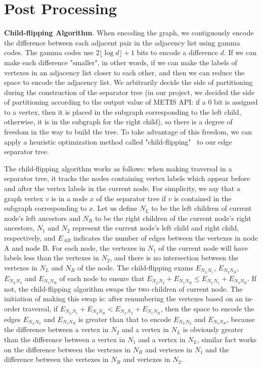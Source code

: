 \documentclass[12pt,glossary]{dalthesis}
\begin{document}
\bigskip
\bigskip

\section{Post Processing}

\textbf{Child-flipping Algorithm}. When encoding the graph, we contiguously encode the difference between each adjacent pair in the adjacency list using gamma codes. The gamma codes use $2\lfloor \log d \rfloor + 1$ bits to encode a difference $d$. If we can make each difference "smaller", in other words, if we can make the labels of vertexes in an adjacency list closer to each other, and then we can reduce the space to encode the adjacency list. We arbitrarily decide the side of partitioning during the construction of the separator tree (in our project, we decided the side of partitioning according to the output value of METIS API: if a 0 bit is assigned to a vertex, then it is placed in the subgraph corresponding to the left child, otherwise, it is in the subgraph for the right child), so there is a degree of freedom in the way to build the tree. To take advantage of this freedom, we can apply a heuristic optimization method called "child-flipping"~\cite{compact-representation} to our edge separator tree.

\bigskip
\bigskip

The child-flipping algorithm works as follows: when making traversal in a separator tree, it tracks the nodes containing vertex labels which appear before and after the vertex labels in the current node. For simplicity, we say that a graph vertex $v$ is in a node $x$ of the separator tree if $v$ is contained in the subgraph corresponding to $x$. Let us define $N_{L}$ to be the left children of current node's left ancestors and $N_{R}$ to be the right children of the current node's right ancestors, $N_{1}$ and $N_{2}$ represent the current node's left child and right child, respectively, and $E_{AB}$ indicates the number of edges between the vertexes in node A and node B. For each node, the vertexes in $N_{1}$ of the current node will have labels less than the vertexes in $N_{2}$, and there is no intersection between the vertexes in $N_{L}$ and $N_{R}$ of the node. The child-flipping exams $E_{N_{L}N_{1}}$, $E_{N_{2}N_{R}}$, $E_{N_{L}N_{2}}$ and $E_{N_{1}N_{R}}$ of each node to ensure that $E_{N_{L}N_{2}} + E_{N_{1}N_{R}} \leq E_{N_{L}N_{1}} + E_{N_{2}N_{R}}$. If not, the child-flipping algorithm swaps the two children of current node. The initiation of making this swap is: after renumbering the vertexes based on an in-order traversal, if $E_{N_{L}N_{1}} + E_{N_{2}N_{R}} < E_{N_{L}N_{2}} + E_{N_{1}N_{R}}$, then the space to encode the edges $E_{N_{L}N_{2}}$ and $E_{N_{1}N_{R}}$ is greater than that to encode $E_{N_{L}N_{2}}$ and $E_{N_{1}N_{R}}$, because the difference between a vertex in $N_{2}$ and a vertex in $N_{L}$ is obviously greater than the difference between a vertex in $N_{1}$ and a vertex in $N_{L}$, similar fact works on the difference between the vertexes in $N_{R}$ and vertexes in $N_{1}$ and the difference between the vertexes in $N_{R}$ and vertexes in $N_{2}$.
\end{document}
